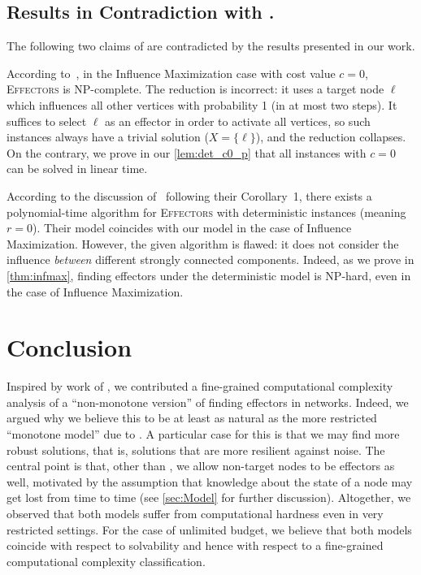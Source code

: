 \documentclass{article}
\newcommand{\probEffectors}{\textsc{Effectors}\xspace}
\begin{document}
\subsection{Results in Contradiction with \citet{LTGMH10}.}\label{sect:flawDetails}
The following two claims of \citet{LTGMH10} are contradicted by the results presented in our work.

According to~\citet[Lemma 1]{LTGMH10}, in the {\sc Influence Maximization} case with cost value $c=0$, 
\probEffectors is NP-complete.
The reduction is incorrect: it uses a target node $\ell$ which influences all other vertices with probability 1 (in at most two steps). 
It suffices to select $\ell$ as an effector in order to activate all
vertices, so such instances always have a trivial solution
($X=\{\ell\}$), and the reduction collapses.
On the contrary, we prove in our \autoref{lem:det_c0_p} that all instances with $c=0$ can be solved in linear time. 

According to the discussion of~\citet{LTGMH10} following
their Corollary~1, there exists a polynomial-time algorithm for \probEffectors with deterministic instances (meaning $r=0$).
Their model coincides with our model in the case of 
{\sc Influence Maximization}. However, the given algorithm is flawed: it does not consider the influence 
\emph{between} different strongly connected components. Indeed, as we prove in \autoref{thm:infmax}, 
finding effectors under the deterministic model is NP-hard, even in
the case of {\sc Influence Maximization}.

\section{Conclusion}
Inspired by work of \citet{LTGMH10}, we contributed a fine-grained computational complexity analysis of a ``non-monotone version'' of finding effectors in networks.
Indeed, we argued why we believe this to be at least as natural as the more restricted ``monotone model'' due to \citet{LTGMH10}. A particular case for this is that we may find more robust solutions, that is, solutions that are more resilient against noise.
The central point is that, other than \citet{LTGMH10}, we allow non-target nodes to be effectors as well, motivated by the assumption that knowledge about the state of a node may get lost from time to time (see \autoref{sec:Model} for further discussion). Altogether, we observed that both models suffer from computational hardness even in very restricted settings. For the case of unlimited budget, we believe that both models coincide with respect to solvability and hence with respect to a fine-grained computational complexity classification.
\end{document}
